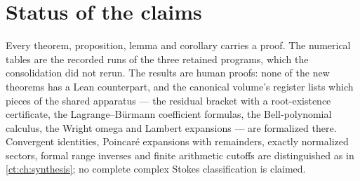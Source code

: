 \documentclass[11pt,openany]{book}
\numberwithin{equation}{chapter}
\theoremstyle{plain}
\theoremstyle{definition}
\theoremstyle{remark}
\begin{document}
\section{Status of the claims}

Every theorem, proposition, lemma and corollary carries a proof.  The
numerical tables are the recorded runs of the three retained programs,
which the consolidation did not rerun.  The results are human proofs: none
of the new theorems has a Lean counterpart, and the canonical volume's
register \cite{tai} lists which pieces of the shared apparatus --- the
residual bracket with a root-existence certificate, the Lagrange--B\"urmann
coefficient formulas, the Bell-polynomial calculus, the Wright omega and
Lambert expansions --- are formalized there.  Convergent identities,
Poincar\'e expansions with remainders, exactly normalized sectors, formal
range inverses and finite arithmetic cutoffs are distinguished as in
\cref{ct:ch:synthesis}; no complete complex Stokes classification is claimed.

\end{document}
